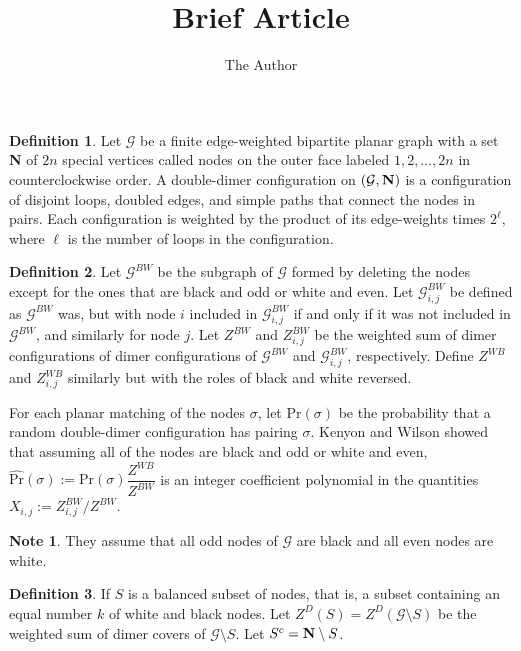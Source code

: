 \documentclass[11pt]{amsart}
\title{Brief Article}
\author{The Author}
\theoremstyle{definition}
\newtheorem*{defn*}{Definition}
\newtheorem*{note*}{Note}
\begin{document}



\begin{defn*}
Let $\mathcal{G}$ be a finite edge-weighted bipartite planar graph with a set {\bf N} of $2n$ special vertices called nodes on the outer face labeled $1, 2, \ldots, 2n$ in counterclockwise order. A double-dimer configuration on $(\mathcal{G}, {\bf N})$ is a configuration of disjoint loops, doubled edges, and simple paths that connect the nodes in pairs. Each configuration is weighted by the product of its edge-weights times $2^{\ell}$, where $\ell$ is the number of loops in the configuration.
\end{defn*}



\begin{defn*}
Let $\mathcal{G}^{BW}$ be the subgraph of $\mathcal{G}$ formed by deleting the nodes except for the ones that are black and odd or white and even. Let $\mathcal{G}^{BW}_{i, j}$ be defined as $\mathcal{G}^{BW}$ was, but with node $i$ included in $\mathcal{G}^{BW}_{i, j}$ if and only if it was not included in $\mathcal{G}^{BW}$, and similarly for node $j$. Let $Z^{BW}$ and $Z^{BW}_{i, j}$ be the weighted sum of dimer configurations of dimer configurations of $\mathcal{G}^{BW}$ and $\mathcal{G}^{BW}_{i, j}$, respectively. Define $Z^{WB}$ and $Z^{WB}_{i, j}$ similarly but with the roles of black and white reversed.
\end{defn*}


For each planar matching of the nodes $\sigma$, let $\text{Pr}(\sigma)$ be the probability that a random double-dimer configuration has pairing $\sigma$. Kenyon and Wilson showed that assuming all of the nodes are black and odd or white and even,  $\widehat{ \text{Pr} }(\sigma) := \text{Pr}(\sigma) \dfrac{ Z^{WB}}{Z^{BW}}$ is an integer coefficient  polynomial in the quantities $X_{i, j} := Z^{BW}_{i, j}/Z^{BW}$.


\begin{note*}
They assume that all odd nodes of $\mathcal{G}$ are black and all even nodes are white.
\end{note*}

\begin{defn*}
If $S$ is a balanced subset of nodes, that is, a subset containing an equal number $k$ of white and black nodes. Let $Z^{D}(S) = Z^{D}( \mathcal{G} \setminus S)$ be the weighted sum of dimer covers of $\mathcal{G} \setminus S$. Let $S^{c} = {\bf N} \setminus S$.
\end{defn*}
\end{document}
